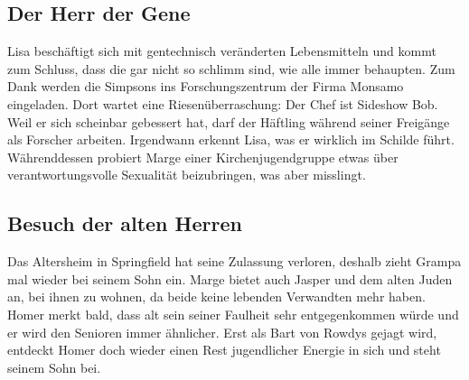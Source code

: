 
\subsection{Der Herr der Gene}
Lisa beschäftigt sich mit gentechnisch veränderten Lebensmitteln und kommt zum Schluss, dass die gar nicht so schlimm sind, wie alle immer behaupten. Zum Dank werden die Simpsons ins Forschungszentrum der Firma Monsamo eingeladen. Dort wartet eine Riesenüberraschung: Der Chef ist Sideshow Bob. Weil er sich scheinbar gebessert hat, darf der Häftling während seiner Freigänge als Forscher arbeiten. Irgendwann erkennt Lisa, was er wirklich im Schilde führt. Währenddessen probiert Marge einer Kirchenjugendgruppe etwas über verantwortungsvolle Sexualität beizubringen, was aber misslingt.


\subsection{Besuch der alten Herren}
Das Altersheim in Springfield hat seine Zulassung verloren, deshalb zieht Grampa mal wieder bei seinem Sohn ein. Marge bietet auch Jasper und dem alten Juden an, bei ihnen zu wohnen, da beide keine lebenden Verwandten mehr haben. Homer merkt bald, dass alt sein seiner Faulheit sehr entgegenkommen würde und er wird den Senioren immer ähnlicher. Erst als Bart von Rowdys gejagt wird, entdeckt Homer doch wieder einen Rest jugendlicher Energie in sich und steht seinem Sohn bei.


